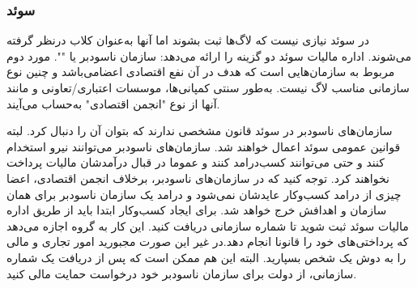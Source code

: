 \subsubsection{سوئد}
در سوئد نیازی نیست که لاگ‌ها ثبت بشوند اما آنها به‌عنوان کلاب
درنظر گرفته می‌شوند. اداره مالیات سوئد دو گزینه را ارائه می‌دهد:
سازمان ناسودبر یا
"".
مورد دوم مربوط به سازمان‌هایی
است که هدف در آن نفع اقتصادی اعضامی‌باشد و چنین نوع سازمانی مناسب
لاگ نیست. به‌طور سنتی کمپانی‌ها، موسسات اعتباری/تعاونی و مانند آنها
از نوع "انجمن اقتصادی" به‌حساب می‌آیند.

سازمان‌های ناسودبر در سوئد قانون مشخصی ندارند که بتوان آن را دنبال کرد.
لبته قوانین عمومی سوئد اعمال خواهند شد. سازمان‌های ناسودبر می‌توانند نیرو
استخدام کنند و حتی می‌توانند کسب‌درامد کنند و عموما در قبال درآمدشان مالیات
پرداخت نخواهند کرد. توجه کنید که در سازمان‌های ناسودبر، برخلاف انجمن اقتصادی،
اعضا چیزی از درامد کسب‌وکار عایدشان نمی‌شود و درامد یک سازمان ناسودبر برای همان
سازمان و اهدافش خرج خواهد شد.
برای ایجاد کسب‌وکار ابتدا باید از طریق اداره مالیات سوئد ثبت شوید تا
شماره سازمانی دریافت کنید. این کار به گروه اجازه می‌دهد که پرداختی‌های خود را
قانونا انجام دهد.در غیر این صورت مجبورید امور تجاری و مالی را به دوش یک شخص
بسپارید.
البته این هم ممکن است که پس از دریافت یک شماره سازمانی، از دولت برای سازمان
ناسودبر خود درخواست حمایت مالی کنید.

